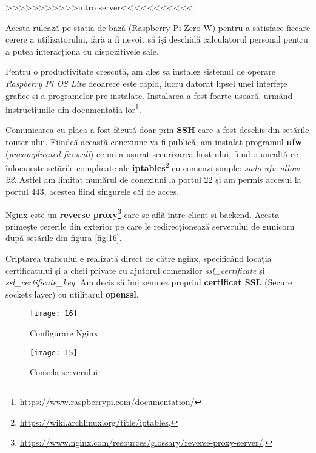 >>>>>>>>>>>intro server<<<<<<<<<<<

Acesta rulează pe stația de bază (Raspberry Pi Zero W) pentru a satisface fiecare cerere a utilizatorului, fără a fi nevoit să își deschidă calculatorul personal pentru a putea interacționa cu dispozitivele sale. 

Pentru o productivitate crescută, am ales să instalez sistemul de operare \emph{Raspberry Pi OS Lite} deoarece este rapid, lucru datorat lipsei unei interfețe grafice și a programelor pre-instalate. Instalarea a fost foarte ușoară, urmând instrucțiunile din documentația lor\footnote{\url{https://www.raspberrypi.com/documentation/}}.

Comunicarea cu placa a fost făcută doar prin \textbf{SSH} care a fost deschis din setările router-ului. Fiindcă această conexiune va fi publică, am instalat programul \textbf{ufw} (\emph{uncomplicated firewall}) ce mi-a ușurat securizarea host-ului, fiind o unealtă ce înlocuiește setările complicate ale \textbf{iptables}\footnote{\url{https://wiki.archlinux.org/title/iptables}.} cu comenzi simple: \emph{sudo ufw allow 22}. Astfel am limitat numărul de conexiuni la portul 22 și am permis accesul la portul 443, acestea fiind singurele  căi de acces.

Nginx este un \textbf{reverse proxy}\footnote{\url{https://www.nginx.com/resources/glossary/reverse-proxy-server/}.} care se află între client și backend. Acesta primește cererile din exterior pe care le redirecționează serverului de gunicorn după setările din figura \ref{fig:16}.

Criptarea traficului e realizată direct de către nginx, specificând locația certificatului și a cheii private cu ajutorul comenzilor \emph{ssl\_certificate} și \emph{ssl\_certificate\_key}. Am decis să îmi semnez propriul \textbf{certificat SSL} (Secure sockets layer) cu utilitarul \textbf{openssl}.

\begin{figure}[h]
	\centering
	\begin{minipage}{0.45\textwidth}
		\centering
		\texttt{[image: 16]}
		\caption{Configurare Nginx}
		\label{fig:16}
	\end{minipage}
	\hfill
	\begin{minipage}{0.45\textwidth}
		\centering
		\texttt{[image: 15]}
		\caption{Consola serverului}
		\label{fig:15}
	\end{minipage}
\end{figure}


